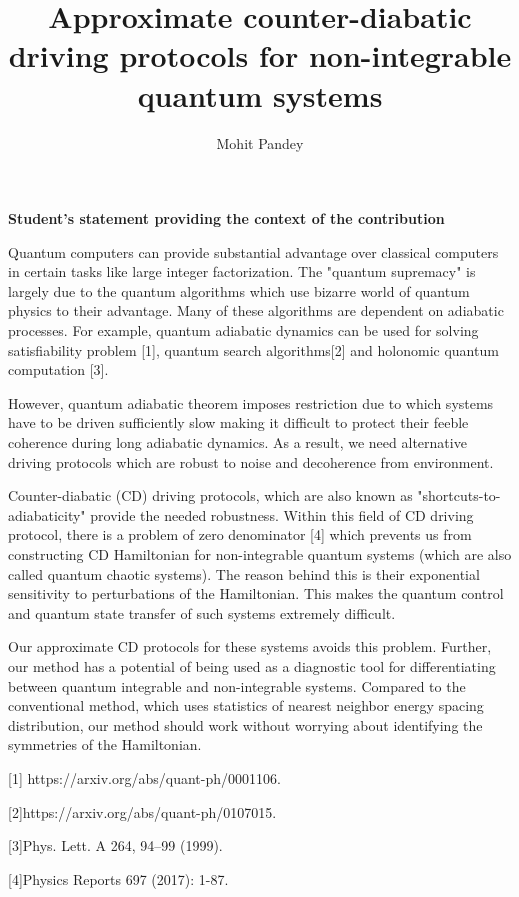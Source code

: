 \documentclass[11pt,a4paper]{article}
\author{Mohit Pandey}
\title{Approximate counter-diabatic driving protocols for non-integrable quantum systems  }
\begin{document}
\maketitle
\textbf{Student's statement  providing the context of the contribution}


Quantum computers can provide substantial advantage over classical computers in certain tasks like large integer factorization. The "quantum supremacy" is largely due to the quantum algorithms which use bizarre world of quantum physics to their advantage. Many of these algorithms are dependent on adiabatic processes. For example, quantum adiabatic dynamics can be used for solving satisfiability problem [1], quantum search algorithms[2] and  holonomic quantum computation [3]. 

However, quantum adiabatic theorem imposes restriction due to which systems have to be driven sufficiently slow making it difficult to protect their feeble coherence during long adiabatic dynamics. As a result, we need alternative driving protocols which are robust to noise and decoherence from environment. 

Counter-diabatic (CD) driving protocols, which are also known as "shortcuts-to-adiabaticity" provide the needed robustness. Within this field of CD driving protocol, there is a problem of zero denominator  [4] which prevents us from constructing CD Hamiltonian for non-integrable quantum systems (which are also called quantum chaotic systems). The reason behind this is their exponential sensitivity to perturbations of the Hamiltonian. This makes the quantum control and quantum state transfer of such systems extremely difficult.

Our approximate CD protocols for these systems avoids this problem. Further, our method has a potential of being used as a diagnostic tool for differentiating between quantum integrable and non-integrable systems. Compared to the conventional method, which uses statistics of nearest neighbor energy spacing distribution, our method should work without worrying about identifying the symmetries of the Hamiltonian. 

[1] https://arxiv.org/abs/quant-ph/0001106.

[2]https://arxiv.org/abs/quant-ph/0107015.

[3]Phys. Lett. A 264, 94–99 (1999).

[4]Physics Reports 697 (2017): 1-87.
\end{document}
